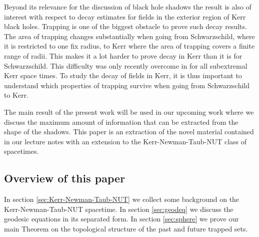 \documentclass[reqno]{amsart}
\numberwithin{equation}{section}
\theoremstyle{plain}
\theoremstyle{definition}
\begin{document}
Beyond its relevance for the discussion of black hole shadows the result is also of interest with respect to decay estimates for fields in the exterior region of Kerr black holes. Trapping is one of the biggest obstacle to prove such decay results. The area of trapping changes substantially when going from Schwarzschild, where it is restricted to one fix radius, to Kerr where the area of trapping covers a finite range of radii. This makes it a lot harder to prove decay in Kerr than it is for Schwarzschild. This difficulty was only recently overcome in \cite{2014arXiv1402.7034D} for all subextremal Kerr space times. To study the decay of fields in Kerr, it is thus important to understand which properties of trapping survive when going from Schwarzschild to Kerr.  

The main result of the present work will be used in our upcoming work \cite{shadows} where we discuss the maximum amount of information that can be extracted from the shape of the shadows. This paper is an extraction of the novel material contained in our lecture notes \cite{oldpaper} with an extension to the Kerr-Newman-Taub-NUT class of spacetimes.
 

\subsection*{Overview of this paper} In section \ref{sec:Kerr-Newman-Taub-NUT} we collect some background on the Kerr-Newman-Taub-NUT spacetime. 
In section \ref{sec:geodeq} we discuss the geodesic equations in its separated form. In section \ref{sec:sphere} we prove our main Theorem on the topological structure of the past and future trapped sets. 

\end{document}
